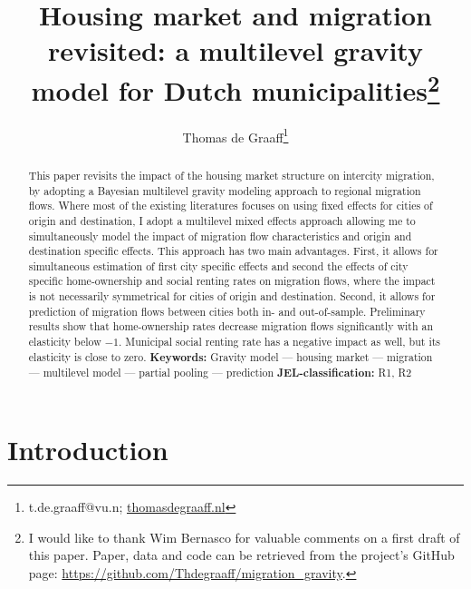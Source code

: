 \documentclass[12pt, parskip, abstracton,notitlepage]{scrartcl}
\begin{document}
\title{Housing market and migration revisited: a multilevel gravity model for Dutch municipalities\thanks{I would like to thank Wim Bernasco for valuable comments on a first
		draft of this paper. Paper, data and code can be retrieved from the
		project's GitHub page:		
		\href{https://github.com/Thdegraaff/migration_gravity}{https://github.com/Thdegraaff/migration\_gravity}.}}
\author[1]{\large Thomas de Graaff\thanks{\Letter{} t.de.graaff@vu.n; \Mundus{} \href{thomasdegraaff.nl}{thomasdegraaff.nl}}}

\date{\vspace{-8ex}} 
\maketitle
\clearpage
\begin{abstract}
\noindent This paper revisits the impact of the housing market
structure on intercity migration, by adopting a Bayesian multilevel gravity modeling approach to regional migration flows. Where most of the existing literatures focuses on using fixed effects for
cities of origin and destination, I adopt a multilevel mixed effects
approach allowing me to simultaneously model the impact of migration flow
characteristics and origin and destination specific effects. This approach has two main advantages. First, it  allows for simultaneous estimation of first city specific effects and second the effects of city specific home-ownership and social renting rates on migration flows, where the impact is not
necessarily symmetrical for cities of origin and
destination. Second, it allows for prediction of migration flows
between cities both in- and out-of-sample. Preliminary results show
that home-ownership rates decrease migration flows significantly with an
elasticity below $-1$. Municipal social renting rate has a negative
impact as well, but its elasticity is close to zero.
\noindent 
\newline
\newline
{\small \textbf{Keywords:} Gravity model --- housing market --- migration --- multilevel model --- partial pooling --- prediction
 \newline
\textbf{JEL-classification:} R1, R2} 
\end{abstract}
\thispagestyle{empty}
	\section{Introduction} %
\end{document}

